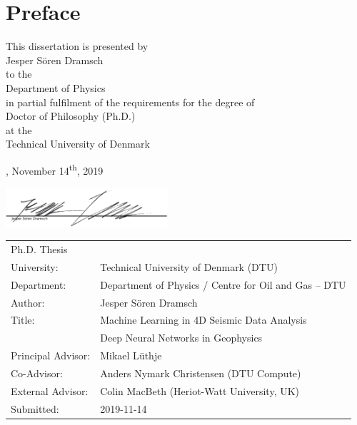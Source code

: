 \chapter{Preface}
\vspace*{1cm}
{\centering
\sffamily
This dissertation is presented by\\[3mm]
{\large Jesper S{\"o}ren Dramsch}\\[3mm]
to the\\[3mm]
{\large Department of Physics}\\[3mm]
in partial fulfilment of the requirements for the degree of\\[3mm]
{\large Doctor of Philosophy (Ph.D.)}\\[3mm]
at the\\[3mm]
{\large Technical University of Denmark}

\vfill

    \thesislocation{}, November 14\textsuperscript{th}, 2019\\[1cm]
\begin{flushright}
    \includegraphics[width=0.45\textwidth]{graphics/Unterschrift.png}\\[1cm]
\end{flushright}
}
\clearpage
\newpage
\vspace*{3cm}
{\sffamily
\begin{tabular}{ll}
Ph.D. Thesis & \\[1mm]
University: & Technical University of Denmark (DTU)  \\[1mm]
Department: & Department of Physics / Centre for Oil and Gas -- DTU \\[1mm]
Author: & Jesper S{\"o}ren Dramsch \\[1mm]
Title: & Machine Learning in 4D Seismic Data Analysis\\[1mm]
       &Deep Neural Networks in Geophysics \\[1mm]
Principal Advisor: \hspace{1cm} & Mikael L{\"u}thje \\[1mm]
Co-Advisor: & Anders Nymark Christensen (DTU Compute) \\[1mm]
External Advisor: & Colin MacBeth (Heriot-Watt University, UK) \\[1mm]
Submitted: & 2019-11-14 
\end{tabular}
}




